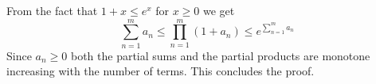 \documentclass[12pt]{article}
\begin{document}
From the fact that $1+x \leq e^{x}$ for $x \geq 0$ we get
\begin{displaymath}
\sum_{n=1}^{m} a_n \leq \prod_{n=1}^{m} (1+a_n) \leq e^{\sum_{n=1}^{m} a_n}
\end{displaymath}
Since $a_n \geq 0$ both the partial sums and the partial products are monotone increasing with the number of terms. This concludes the proof.
\end{document}
